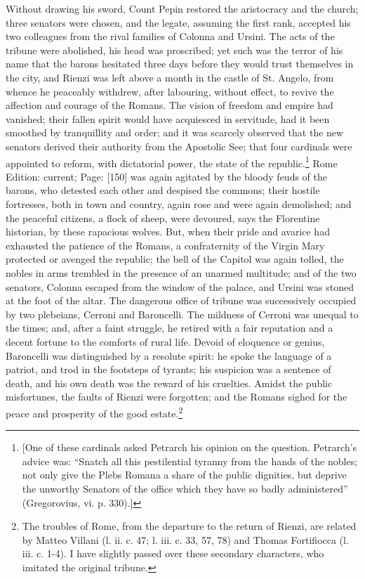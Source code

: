 Without drawing his sword, Count Pepin restored the aristocracy and the church; three senators were chosen, and the legate, assuming the first rank, accepted his two colleagues from the rival families of Colonna and Ursini. The acts of the tribune were abolished, his head was proscribed; yet such was the terror of his name that the barons hesitated three days before they would trust themselves in the city, and Rienzi was left above a month in the castle of St. Angelo, from whence he peaceably withdrew, after labouring, without effect, to revive the affection and courage of the Romans. The vision of freedom and empire had vanished; their fallen spirit would have acquiesced in servitude, had it been smoothed by tranquillity and order; and it was scarcely observed that the new senators derived their authority from the Apostolic See; that four cardinals were appointed to reform, with dictatorial power, the state of the republic.\footnote{[One of these cardinals asked Petrarch his opinion on the question. Petrarch\texthebrew{}’s advice was: \texthebrew{“}Snatch all this pestilential tyranny from the hands of the nobles; not only give the Plebs Romana a share of the public dignities, but deprive the unworthy Senators of the office which they have so badly administered\texthebrew{}” (Gregorovius, vi. p. 330).]} Rome Edition: current; Page: [150] was again agitated by the bloody feuds of the barons, who detested each other and despised the commons; their hostile fortresses, both in town and country, again rose and were again demolished; and the peaceful citizens, a flock of sheep, were devoured, says the Florentine historian, by these rapacious wolves. But, when their pride and avarice had exhausted the patience of the Romans, a confraternity of the Virgin Mary protected or avenged the republic; the bell of the Capitol was again tolled, the nobles in arms trembled in the presence of an unarmed multitude; and of the two senators, Colonna escaped from the window of the palace, and Ursini was stoned at the foot of the altar. The dangerous office of tribune was successively occupied by two plebeians, Cerroni and Baroncelli. The mildness of Cerroni was unequal to the times; and, after a faint struggle, he retired with a fair reputation and a decent fortune to the comforts of rural life. Devoid of eloquence or genius, Baroncelli was distinguished by a resolute spirit: he spoke the language of a patriot, and trod in the footsteps of tyrants; his suspicion was a sentence of death, and his own death was the reward of his cruelties. Amidst the public misfortunes, the faults of Rienzi were forgotten; and the Romans sighed for the peace and prosperity of the good estate.\footnote{The troubles of Rome, from the departure to the return of Rienzi, are related by Matteo Villani (l. ii. c. 47; l. iii. c. 33, 57, 78) and Thomas Fortifiocca (l. iii. c. 1-4). I have slightly passed over these secondary characters, who imitated the original tribune.}

